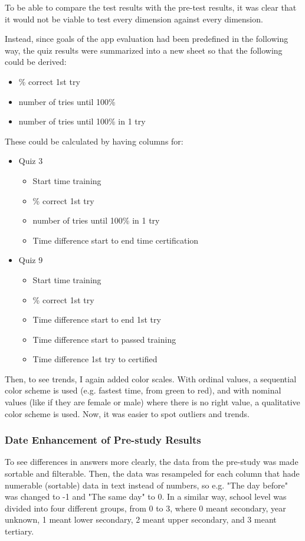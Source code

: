 To be able to compare the test results with the pre-test results, it was clear that it would not be viable to test every dimension against every dimension.

Instead, since goals of the app evaluation had been predefined in the following way, the quiz results were summarized into a new sheet so that the following could be derived:

\begin{itemize}
\item \% correct 1st try
\item number of tries until 100\%
\item number of tries until 100\% in 1 try
\end{itemize}

These could be calculated by having columns for:

\begin{itemize}
  \item Quiz 3
  \begin{itemize}
    \item Start time training
    \item \% correct 1st try
    \item number of tries until 100\% in 1 try
    \item Time difference start to end time certification
  \end{itemize}
  \item Quiz 9
  \begin{itemize}
    \item Start time training
    \item \% correct 1st try
    \item Time difference start to end 1st try
    \item Time difference start to passed training
    \item Time difference 1st try to certified
  \end{itemize}
\end{itemize}

Then, to see trends, I again added color scales. With ordinal values, a sequential color scheme is used (e.g. fastest time, from green to red), and with nominal values (like if they are female or male) where there is no right value, a qualitative color scheme is used. Now, it was easier to spot outliers and trends.

\subsubsection{Date Enhancement of Pre-study Results}
To see differences in answers more clearly, the data from the pre-study was made sortable and filterable. Then, the data was resampeled for each column that hade numerable (sortable) data in text instead of numbers, so e.g. "The day before" was changed to -1 and "The same day" to 0. In a similar way, school level was divided into four different groups, from 0 to 3, where 0 meant secondary, year unknown, 1 meant lower secondary, 2 meant upper secondary, and 3 meant tertiary.

